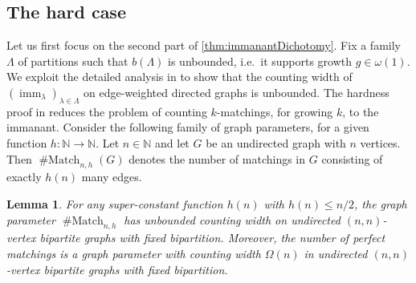 \documentclass[10pt,a4paper]{article}
\theoremstyle{definition}
\theoremstyle{plain}
\newtheorem{lemma}[definition]{Lemma}
\theoremstyle{remark}
\newcommand{\bbN}{\mathbb{N}}
\DeclareMathOperator{\imm}{imm}
\DeclareMathOperator{\Match}{\# Match}
\begin{document}
\subsection{The hard case}
Let us first focus on the second part of \cref{thm:immanantDichotomy}.
Fix a family $\Lambda$ of partitions such that $b(\Lambda)$ is unbounded, i.e.\ it supports growth $g \in \omega(1)$.
We exploit the detailed analysis in \cite{curticapean2021complexitydichotomyimmanantfamilies} to show that the counting width of $(\imm_{\lambda})_{\lambda \in \Lambda}$ on edge-weighted directed graphs is unbounded. The hardness proof in \cite{curticapean2021full} reduces the problem of counting $k$-matchings, for growing $k$, to the immanant. 
Consider the following family of graph parameters, for a given function $h\colon \bbN \to \bbN$. Let $n \in \bbN$ and let $G$ be an undirected graph with $n$ vertices. Then $\Match_{n,h}(G)$ denotes the number of matchings in $G$ consisting of exactly $h(n)$ many edges.
\begin{lemma}
	\label{lem:kMatchingUnboundedCountingWidth}
	For any super-constant function $h(n)$ with $h(n) \leq n/2$, the graph parameter $\Match_{n,h}$ has unbounded counting width on undirected $(n,n)$-vertex bipartite graphs with fixed bipartition.
	Moreover, the number of \emph{perfect} matchings is a graph parameter with counting width $\Omega(n)$ in undirected $(n,n)$-vertex bipartite graphs with fixed bipartition.
\end{lemma}	
\end{document}
